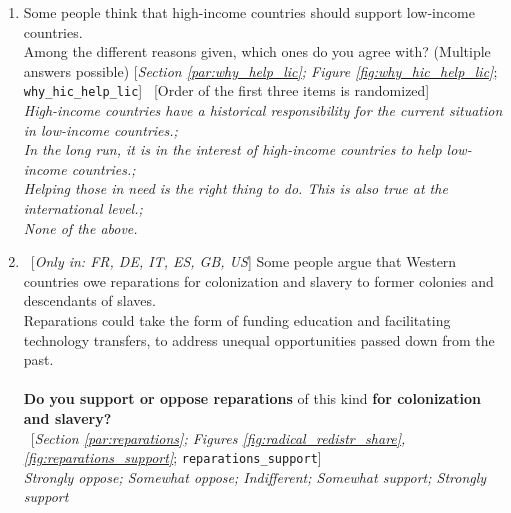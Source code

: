 \begin{enumerate}[resume]
\item  \label{q:why_hic_help_lic} Some people think that high-income countries should support low-income countries.~\\Among the different reasons given, which ones do you agree with? (Multiple answers possible) [\textit{Section \ref{par:why_help_lic}; Figure \ref{fig:why_hic_help_lic}}; 
\verb|why_hic_help_lic|]
~[Order of the first three items is randomized]
  \\ \textit{High-income countries have a historical responsibility for the current situation in low-income countries.; \\In the long run, it is in the interest of high-income countries to help low-income countries.; \\Helping those in need is the right thing to do. This is also true at the international level.; \\None of the above.}

\item ~[\textit{Only in: FR, DE, IT, ES, GB, US}] \label{q:reparations_support} Some people argue that Western countries owe reparations for colonization and slavery to former colonies and descendants of slaves. \\Reparations could take the form of funding education and facilitating technology transfers, to address unequal opportunities passed down from the past. \\\\\textbf{Do you support or oppose reparations} of this kind \textbf{for colonization and slavery?~}\\ 
~[\textit{Section \ref{par:reparations}; Figures \ref{fig:radical_redistr_share}, \ref{fig:reparations_support}}; 
\verb|reparations_support|]
  \\ \textit{Strongly oppose; Somewhat oppose; Indifferent; Somewhat support; Strongly support}

\end{enumerate} 

